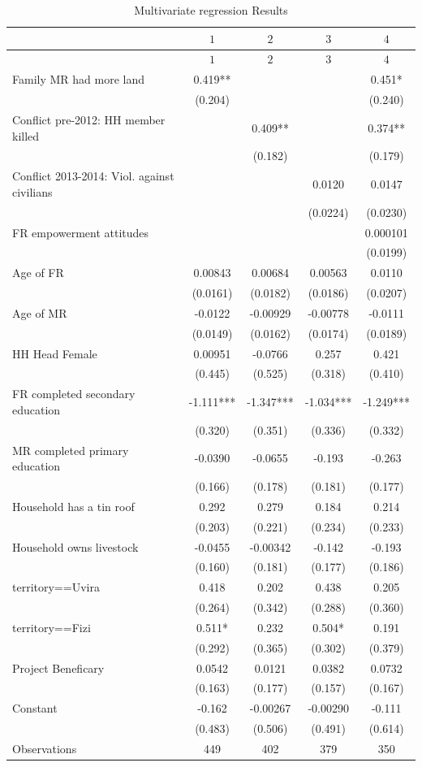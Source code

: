 \documentclass[
]{article}
\begin{document}
\label{tab:results_regression}
\begin{longtable}[]{@{}lcccc@{}}
\caption{Multivariate regression Results}\tabularnewline
\toprule\noalign{}
& \(1\) & \(2\) & \(3\) & \(4\) \\
\midrule\noalign{}
\endfirsthead
\toprule\noalign{}
& \(1\) & \(2\) & \(3\) & \(4\) \\
\midrule\noalign{}
\endhead
\bottomrule\noalign{}
\endlastfoot
Family MR had more land & 0.419** & & & 0.451* \\
& (0.204) & & & (0.240) \\
Conflict pre-2012: HH member killed & & 0.409** & & 0.374** \\
& & (0.182) & & (0.179) \\
Conflict 2013-2014: Viol. against civilians & & & 0.0120 & 0.0147 \\
& & & (0.0224) & (0.0230) \\
FR empowerment attitudes & & & & 0.000101 \\
& & & & (0.0199) \\
Age of FR & 0.00843 & 0.00684 & 0.00563 & 0.0110 \\
& (0.0161) & (0.0182) & (0.0186) & (0.0207) \\
Age of MR & -0.0122 & -0.00929 & -0.00778 & -0.0111 \\
& (0.0149) & (0.0162) & (0.0174) & (0.0189) \\
HH Head Female & 0.00951 & -0.0766 & 0.257 & 0.421 \\
& (0.445) & (0.525) & (0.318) & (0.410) \\
FR completed secondary education & -1.111*** & -1.347*** & -1.034*** &
-1.249*** \\
& (0.320) & (0.351) & (0.336) & (0.332) \\
MR completed primary education & -0.0390 & -0.0655 & -0.193 & -0.263 \\
& (0.166) & (0.178) & (0.181) & (0.177) \\
Household has a tin roof & 0.292 & 0.279 & 0.184 & 0.214 \\
& (0.203) & (0.221) & (0.234) & (0.233) \\
Household owns livestock & -0.0455 & -0.00342 & -0.142 & -0.193 \\
& (0.160) & (0.181) & (0.177) & (0.186) \\
territory==Uvira & 0.418 & 0.202 & 0.438 & 0.205 \\
& (0.264) & (0.342) & (0.288) & (0.360) \\
territory==Fizi & 0.511* & 0.232 & 0.504* & 0.191 \\
& (0.292) & (0.365) & (0.302) & (0.379) \\
Project Beneficary & 0.0542 & 0.0121 & 0.0382 & 0.0732 \\
& (0.163) & (0.177) & (0.157) & (0.167) \\
Constant & -0.162 & -0.00267 & -0.00290 & -0.111 \\
& (0.483) & (0.506) & (0.491) & (0.614) \\
Observations & 449 & 402 & 379 & 350 \\
\end{longtable}
\end{document}
